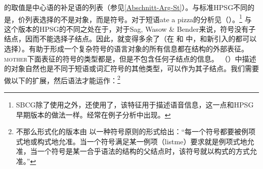 \noindent
\comps{}的取值是中心语的补足语的列表（参见\ref{Abschnitt-Arg-St}）。与标准HPSG\indexhpsg 不同的是，价列表选择的不是对象，而是符号。对于短语ate a pizza的分析见（）。\footnote{%
  SBCG除了使用\phonfc 之外，还使用了\formfc，该特征用于描述语音信息，这一点和HPSG早期版本的做法一样\citep[\S~3.1, \S~3.6]{Sag2012a}。\formfc 经常在例子分析中出现。
}
\ea
\label{feat-geom-swb}
\z
与 \citet{ps2}这个版本的HPSG的不同之处在于，对于Sag, Wasow \& Bender来说，符号没有子结点，因而不能选择子结点。因此，\synsemfc{}就变得多余了（在 和 中，\phonvc 和新引入的\formfc 都可以选择）。有助于形成一个复杂符号的语言对象的所有信息都在结构的外部表征。\textsc{mother}下面表征的符号的类型都是，但是不包含任何子结点的信息。 （）中描述的对象自然也是不同于短语或词汇符号的其他类型，可以作为其子结点。我们需要做以下的扩展，然后语法才能运作\citep*[]{SWB2003a}：\footnote{%
不那么形式化的版本由 \citet[]{Sag2012a}以一种符号原则的形式给出：“每一个符号都要被例项式地或构式地允准。当一个符号满足某一例项（listme）要求就是例项式地允准，当一个符号是某一合乎语法的结构的父结点时，该符号就以构式的方式允准。” 
}
